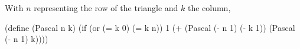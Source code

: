 With $n$ representing the row of the triangle and $k$ the column, 

\begscmtt
(define (Pascal n k)
  (if (or (= k 0) (= k n))
      1
      (+ (Pascal (- n 1) (- k 1))
         (Pascal (- n 1) k))))
\endtt

